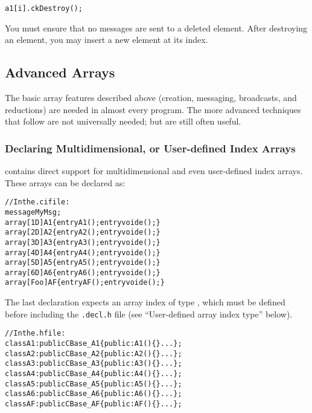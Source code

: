\begin{alltt}
a1[i].ckDestroy();
\end{alltt}

You must ensure that no messages are sent to a deleted element. 
After destroying an element, you may insert a new element at
its index.




\subsection{Advanced Arrays}

\label{advanced arrays}

The basic array features described above (creation, messaging,
broadcasts, and reductions) are needed in almost every
\charmpp{} program.  The more advanced techniques that follow
are not universally needed; but are still often useful.


\subsubsection{Declaring Multidimensional, or User-defined Index Arrays}

\charmpp{} contains direct support for multidimensional and
even user-defined index arrays.  These arrays can be declared as:

\begin{alltt}
//In the .ci file:
message MyMsg;
array [1D] A1 \{ entry A1(); entry void e();\}
array [2D] A2 \{ entry A2(); entry void e();\}
array [3D] A3 \{ entry A3(); entry void e();\}
array [4D] A4 \{ entry A4(); entry void e();\}
array [5D] A5 \{ entry A5(); entry void e();\}
array [6D] A6 \{ entry A6(); entry void e();\}
array [Foo] AF \{ entry AF(); entry void e();\}
\end{alltt}

The last declaration expects an array index of type ,
which must be defined before including the \texttt{.decl.h} file 
(see ``User-defined array index type'' below).  

\begin{alltt}
//In the .h file:
class A1 : public CBase\_A1 \{ public: A1()\{\} ...\};
class A2 : public CBase\_A2 \{ public: A2()\{\} ...\};
class A3 : public CBase\_A3 \{ public: A3()\{\} ...\};
class A4 : public CBase\_A4 \{ public: A4()\{\} ...\};
class A5 : public CBase\_A5 \{ public: A5()\{\} ...\};
class A6 : public CBase\_A6 \{ public: A6()\{\} ...\};
class AF : public CBase\_AF \{ public: AF()\{\} ...\};
\end{alltt}

